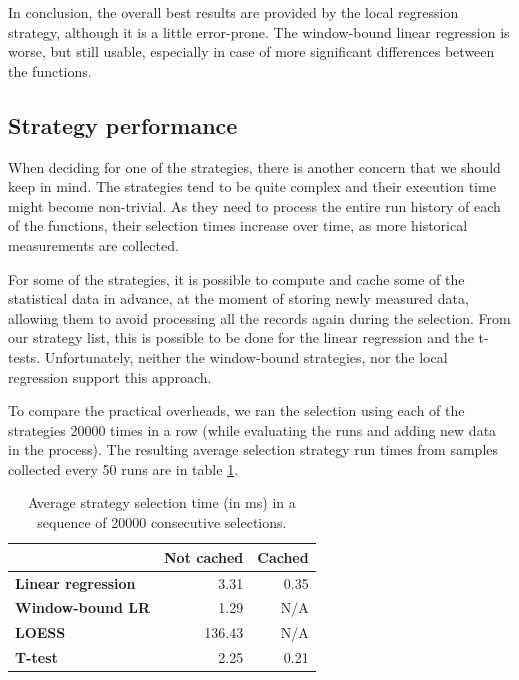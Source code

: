 In conclusion, the overall best results are provided by the local regression strategy, although it is a little error-prone. The window-bound linear regression is worse, but still usable, especially in case of more significant differences between the functions.

\subsection{Strategy performance}
\label{subsec:strategy_perf}

When deciding for one of the strategies, there is another concern that we should keep in mind. The strategies tend to be quite complex and their execution time might become non-trivial. As they need to process the entire run history of each of the functions, their selection times increase over time, as more historical measurements are collected.

For some of the strategies, it is possible to compute and cache some of the statistical data in advance, at the moment of storing newly measured data, allowing them to avoid processing all the records again during the selection. From our strategy list, this is possible to be done for the linear regression and the t-tests. Unfortunately, neither the window-bound strategies, nor the local regression support this approach.

To compare the practical overheads, we ran the selection using each of the strategies 20000 times in a row (while evaluating the runs and adding new data in the process). The resulting average selection strategy run times from samples collected every 50 runs are in table \ref{tab:strategy_execution_comparison}.

\begin{table}[h!]
	\captionsetup{justification=centering,margin=0.5cm}
	\centering
	\bgroup
	\def\arraystretch{1.5}%
	\begin{tabular}{|l|r|r|}
		\hline
		& \multicolumn{1}{l|}{\textbf{Not cached}} & \multicolumn{1}{l|}{\textbf{Cached}} \\ \hline
		\textbf{Linear regression} & 3.31                                   & 0.35                                 \\ \hline
		\textbf{Window-bound LR}   & 1.29                                   & N/A                                  \\ \hline
		\textbf{LOESS}             & 136.43                                 & N/A                                  \\ \hline
		\textbf{T-test}            & 2.25                                   & 0.21                                 \\ \hline
	\end{tabular}
\egroup
\caption{Average strategy selection time (in ms) in a sequence of 20000 consecutive selections.}
\label{tab:strategy_execution_comparison}
\end{table}

